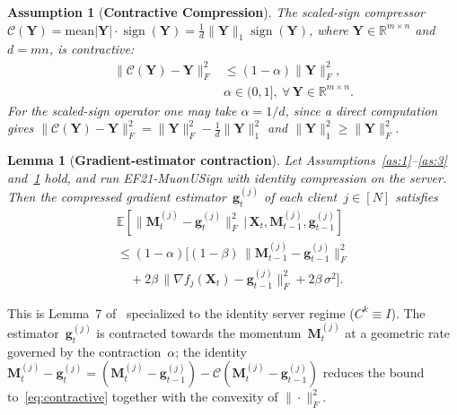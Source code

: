 \documentclass[letterpaper]{article} %
\newtheorem{lemma}{Lemma}
\newtheorem{assumption}{Assumption}
\begin{document}
\begin{assumption}[\textbf{Contractive Compression}]\label{as:5}
The scaled-sign compressor $\mathcal{C}(\mathbf{Y}) = \mathrm{mean}|\mathbf{Y}|\cdot\operatorname{sign}(\mathbf{Y}) = \tfrac{1}{d}\|\mathbf{Y}\|_1\operatorname{sign}(\mathbf{Y})$, where $\mathbf{Y}\in\mathbb{R}^{m\times n}$ and $d=mn$, is contractive:
\begin{equation}\label{eq:contractive}
\begin{split}
\|\mathcal{C}(\mathbf{Y})-\mathbf{Y}\|_F^2 &\le (1-\alpha)\|\mathbf{Y}\|_F^2, \\
&\alpha\in(0,1],\ \forall\,\mathbf{Y}\in\mathbb{R}^{m\times n}.
\end{split}
\end{equation}
For the scaled-sign operator one may take $\alpha=1/d$, since a direct computation gives $\|\mathcal{C}(\mathbf{Y})-\mathbf{Y}\|_F^2 = \|\mathbf{Y}\|_F^2 - \tfrac{1}{d}\|\mathbf{Y}\|_1^2$ and $\|\mathbf{Y}\|_1^2 \ge \|\mathbf{Y}\|_F^2$.
\end{assumption}

\begin{lemma}[\textbf{Gradient-estimator contraction}]\label{lem:est}
Let Assumptions~\ref{as:1}--\ref{as:3} and~\ref{as:5} hold, and run EF21-MuonUSign with identity compression on the server. Then the compressed gradient estimator~$\mathbf{g}_t^{(j)}$ of each client~$j\in[N]$ satisfies
\begin{multline}
\mathbb{E}\!\left[\|\mathbf{M}_t^{(j)}-\mathbf{g}_t^{(j)}\|_F^2 \,\big|\, \mathbf{X}_t,\mathbf{M}_{t-1}^{(j)},\mathbf{g}_{t-1}^{(j)}\right] \\
\le (1-\alpha)\!\big[(1-\beta)\,\|\mathbf{M}_{t-1}^{(j)}-\mathbf{g}_{t-1}^{(j)}\|_F^2 \\
\quad + 2\beta\,\|\nabla f_j(\mathbf{X}_t)-\mathbf{g}_{t-1}^{(j)}\|_F^2 + 2\beta\,\sigma^2\big].
\end{multline}
\end{lemma}
\noindent This is Lemma~7 of~\cite{gruntkowska2025error} specialized to the identity server regime ($C^k \equiv I$). The estimator~$\mathbf{g}_t^{(j)}$ is contracted towards the momentum~$\mathbf{M}_t^{(j)}$ at a geometric rate governed by the contraction~$\alpha$; the identity $\mathbf{M}_t^{(j)}-\mathbf{g}_t^{(j)} = (\mathbf{M}_t^{(j)}-\mathbf{g}_{t-1}^{(j)}) - \mathcal{C}(\mathbf{M}_t^{(j)}-\mathbf{g}_{t-1}^{(j)})$ reduces the bound to~\eqref{eq:contractive} together with the convexity of $\|\cdot\|_F^2$.
\end{document}
